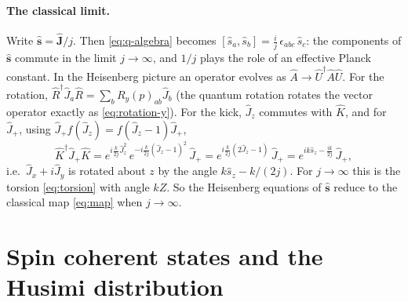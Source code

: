 \documentclass[11pt,a4paper]{article}
\newcommand{\vJ}{\bm{J}}
\begin{document}
\paragraph{The classical limit.} Write $\hat{\bm s} = \hat{\vJ}/j$. Then \eqref{eq:q-algebra} becomes $[\hat s_a, \hat
s_b] = \frac{i}{j}\,\epsilon_{abc}\,\hat s_c$: the components of $\hat{\bm s}$ commute in the limit $j\to\infty$, and
$1/j$ plays the role of an effective Planck constant. In the Heisenberg picture an operator evolves as $\hat A \to
\hat U^\dagger\hat A\hat U$. For the rotation, $\hat R^\dagger\hat J_a\hat R = \sum_b R_y(p)_{ab}\hat J_b$ (the quantum
rotation rotates the vector operator exactly as \eqref{eq:rotation-y}). For the kick, $\hat J_z$ commutes with $\hat K$,
and for $\hat J_+$, using $\hat J_+ f(\hat J_z) = f(\hat J_z - 1)\hat J_+$,
\begin{equation*}
  \hat K^\dagger\hat J_+\hat K = e^{i\frac{k}{2j}\hat J_z^2}\,e^{-i\frac{k}{2j}(\hat J_z-1)^2}\,\hat J_+
  = e^{i\frac{k}{2j}(2\hat J_z - 1)}\,\hat J_+ = e^{ik\hat s_z - \frac{ik}{2j}}\,\hat J_+ ,
\end{equation*}
i.e.\ $\hat J_x + i\hat J_y$ is rotated about $z$ by the angle $k\hat s_z - k/(2j)$. For $j\to\infty$ this is the
torsion \eqref{eq:torsion} with angle $kZ$. So the Heisenberg equations of $\hat{\bm s}$ reduce to the classical map
\eqref{eq:map} when $j\to\infty$.

\section{Spin coherent states and the Husimi distribution}\label{sec:coherent}
\end{document}

